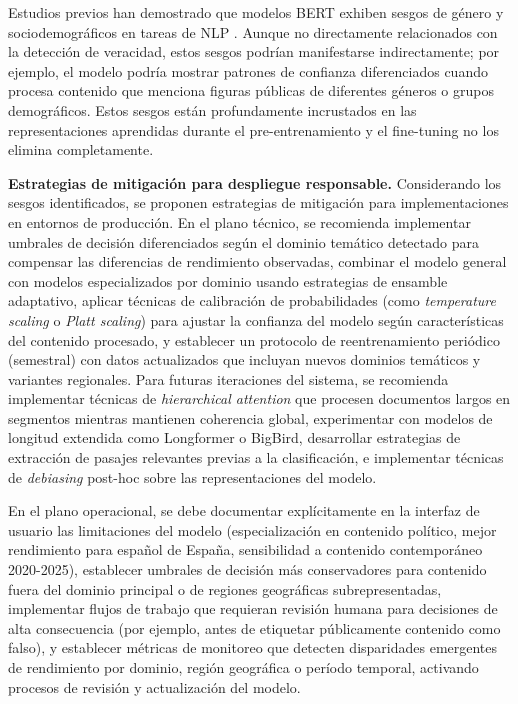 Estudios previos han demostrado que modelos BERT exhiben sesgos de género y sociodemográficos en tareas de NLP \cite{kurita2019measuring}. Aunque no directamente relacionados con la detección de veracidad, estos sesgos podrían manifestarse indirectamente; por ejemplo, el modelo podría mostrar patrones de confianza diferenciados cuando procesa contenido que menciona figuras públicas de diferentes géneros o grupos demográficos. Estos sesgos están profundamente incrustados en las representaciones aprendidas durante el pre-entrenamiento y el fine-tuning no los elimina completamente.

\textbf{Estrategias de mitigación para despliegue responsable.} Considerando los sesgos identificados, se proponen estrategias de mitigación para implementaciones en entornos de producción. En el plano técnico, se recomienda implementar umbrales de decisión diferenciados según el dominio temático detectado para compensar las diferencias de rendimiento observadas, combinar el modelo general con modelos especializados por dominio usando estrategias de ensamble adaptativo, aplicar técnicas de calibración de probabilidades (como \textit{temperature scaling} o \textit{Platt scaling}) para ajustar la confianza del modelo según características del contenido procesado, y establecer un protocolo de reentrenamiento periódico (semestral) con datos actualizados que incluyan nuevos dominios temáticos y variantes regionales. Para futuras iteraciones del sistema, se recomienda implementar técnicas de \textit{hierarchical attention} que procesen documentos largos en segmentos mientras mantienen coherencia global, experimentar con modelos de longitud extendida como Longformer o BigBird, desarrollar estrategias de extracción de pasajes relevantes previas a la clasificación, e implementar técnicas de \textit{debiasing} post-hoc sobre las representaciones del modelo.

En el plano operacional, se debe documentar explícitamente en la interfaz de usuario las limitaciones del modelo (especialización en contenido político, mejor rendimiento para español de España, sensibilidad a contenido contemporáneo 2020-2025), establecer umbrales de decisión más conservadores para contenido fuera del dominio principal o de regiones geográficas subrepresentadas, implementar flujos de trabajo que requieran revisión humana para decisiones de alta consecuencia (por ejemplo, antes de etiquetar públicamente contenido como falso), y establecer métricas de monitoreo que detecten disparidades emergentes de rendimiento por dominio, región geográfica o período temporal, activando procesos de revisión y actualización del modelo.

